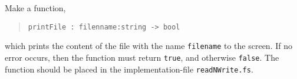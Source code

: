 \label{cat:printFile}
Make a function,
\begin{quote}
  \mbox{\lstinline!printFile : filenname:string -> bool!}
\end{quote}
which prints the content of the file with the name
\lstinline{filename} to the screen. If no error occurs, then the
function must return \lstinline{true}, and otherwise
\lstinline{false}.  The function should be placed in the
implementation-file \lstinline{readNWrite.fs}.
